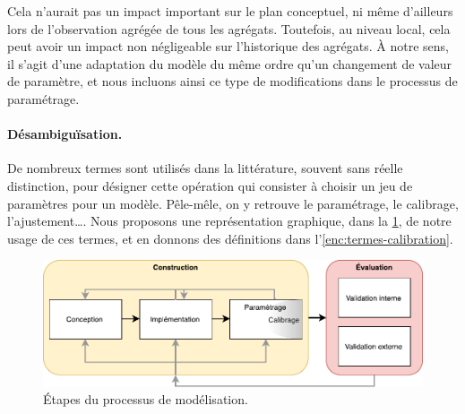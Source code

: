 Cela n'aurait pas un impact important sur le plan conceptuel, ni même d'ailleurs lors de l'observation agrégée de tous les agrégats.
Toutefois, au niveau local, cela peut avoir un impact non négligeable sur l'historique des agrégats.
À notre sens, il s'agit d'une adaptation du modèle du même ordre qu'un changement de valeur de paramètre, et nous incluons ainsi ce type de modifications dans le processus de paramétrage.


\paragraph{Désambiguïsation.}

De nombreux termes sont utilisés dans la littérature, souvent sans réelle distinction, pour désigner cette opération qui consister à choisir un jeu de paramètres pour un modèle.
Pêle-mêle, on y retrouve le paramétrage, le calibrage, l'ajustement\ldots.
Nous proposons une représentation graphique, dans la \cref{fig:etapes-modelisation}, de notre usage de ces termes, et en donnons des définitions dans l'\cref{enc:termes-calibration}.

\begin{figure}[H]
	\includegraphics[width=1.2\textwidth]{img/schema_definition_parametrage.pdf}
	\caption{Étapes du processus de modélisation.} 
	\label{fig:etapes-modelisation} 
\end{figure}

